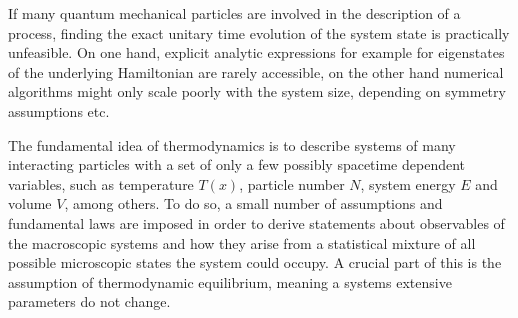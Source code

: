 If many quantum mechanical particles are involved in the description of a process, finding the exact unitary time evolution of the system state is practically unfeasible. On one hand, explicit analytic expressions for example for eigenstates of the underlying Hamiltonian are rarely accessible, on the other hand numerical algorithms might only scale poorly with the system size, depending on symmetry assumptions etc.

The fundamental idea of thermodynamics is to describe systems of many interacting particles with a set of only a few possibly spacetime dependent variables, such as temperature $T(x)$, particle number $N$, system energy $E$ and volume $V$, among others. To do so, a small number of assumptions and fundamental laws are imposed in order to derive statements about observables of the macroscopic systems and how they arise from a statistical mixture of all possible microscopic states the system could occupy. A crucial part of this is the assumption of thermodynamic equilibrium, meaning a systems extensive parameters do not change. 

